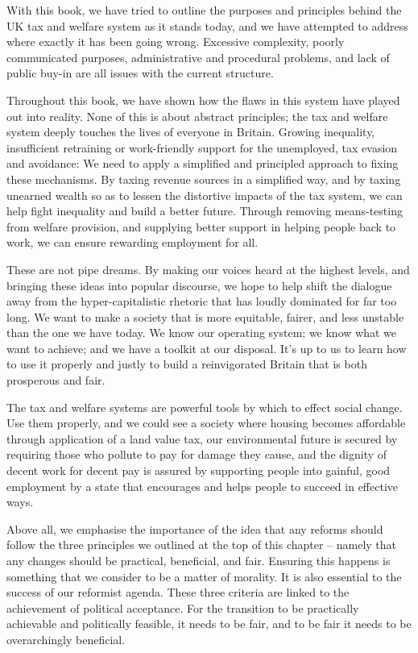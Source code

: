 \documentclass[]{tufte-handout}
\begin{document}
With this book, we have tried to outline the purposes and principles
behind the UK tax and welfare system as it stands today, and we have
attempted to address where exactly it has been going wrong. Excessive
complexity, poorly communicated purposes, administrative and procedural
problems, and lack of public buy-in are all issues with the current
structure.

Throughout this book, we have shown how the flaws in this system have
played out into reality. None of this is about abstract principles; the
tax and welfare system deeply touches the lives of everyone in Britain.
Growing inequality, insufficient retraining or work-friendly support for
the unemployed, tax evasion and avoidance: We need to apply a simplified
and principled approach to fixing these mechanisms. By taxing revenue
sources in a simplified way, and by taxing unearned wealth so as to
lessen the distortive impacts of the tax system, we can help fight
inequality and build a better future. Through removing means-testing
from welfare provision, and supplying better support in helping people
back to work, we can ensure rewarding employment for all.

These are not pipe dreams. By making our voices heard at the highest
levels, and bringing these ideas into popular discourse, we hope to help
shift the dialogue away from the hyper-capitalistic rhetoric that has
loudly dominated for far too long. We want to make a society that is
more equitable, fairer, and less unstable than the one we have today. We
know our operating system; we know what we want to achieve; and we have
a toolkit at our disposal. It's up to us to learn how to use it properly
and justly to build a reinvigorated Britain that is both prosperous and
fair.

The tax and welfare systems are powerful tools by which to effect social
change. Use them properly, and we could see a society where housing
becomes affordable through application of a land value tax, our
environmental future is secured by requiring those who pollute to pay
for damage they cause, and the dignity of decent work for decent pay is
assured by supporting people into gainful, good employment by a state
that encourages and helps people to succeed in effective ways.

Above all, we emphasise the importance of the idea that any reforms
should follow the three principles we outlined at the top of this
chapter -- namely that any changes should be practical, beneficial, and
fair. Ensuring this happens is something that we consider to be a matter
of morality. It is also essential to the success of our reformist
agenda. These three criteria are linked to the achievement of political
acceptance. For the transition to be practically achievable and
politically feasible, it needs to be fair, and to be fair it needs to be
overarchingly beneficial.
\end{document}
